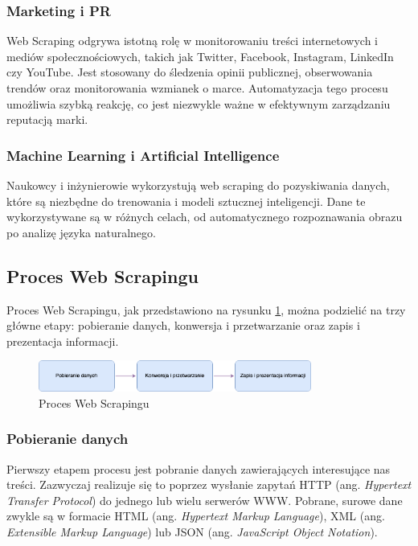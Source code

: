 \subsubsection{Marketing i PR}

Web Scraping odgrywa istotną rolę w monitorowaniu treści internetowych i mediów społecznościowych, takich jak Twitter, Facebook, Instagram, LinkedIn czy YouTube.
Jest stosowany do śledzenia opinii publicznej, obserwowania trendów oraz monitorowania wzmianek o marce.
Automatyzacja tego procesu umożliwia szybką reakcję, co jest niezwykle ważne w efektywnym zarządzaniu reputacją marki\cite{monitoring-social-media}.

\subsubsection{Machine Learning i Artificial Intelligence}

Naukowcy i inżynierowie wykorzystują web scraping do pozyskiwania danych, które są niezbędne do trenowania i modeli sztucznej inteligencji\cite{openai-data-collection}.
Dane te wykorzystywane są w różnych celach, od automatycznego rozpoznawania obrazu po analizę języka naturalnego.


\subsection{Proces Web Scrapingu}\label{subsec:web-scraping-process}

Proces Web Scrapingu, jak przedstawiono na rysunku \ref{fig:scraping-process}, można podzielić na trzy główne etapy: pobieranie danych, konwersja i przetwarzanie oraz zapis i prezentacja informacji\cite{persson}.

\begin{figure}[H]
    \centering
    \includegraphics[width=0.8\textwidth]{img/scraping-process}
    \caption{Proces Web Scrapingu}
    \label{fig:scraping-process}
\end{figure}

\subsubsection{Pobieranie danych}

Pierwszy etapem procesu jest pobranie danych zawierających interesujące nas treści.
Zazwyczaj realizuje się to poprzez wysłanie zapytań HTTP (ang. \emph{Hypertext Transfer Protocol}) do jednego lub wielu serwerów WWW\@.
Pobrane, surowe dane zwykle są w formacie HTML (ang. \emph{Hypertext Markup Language}), XML (ang. \emph{Extensible Markup Language}) lub JSON (ang. \emph{JavaScript Object Notation}).

